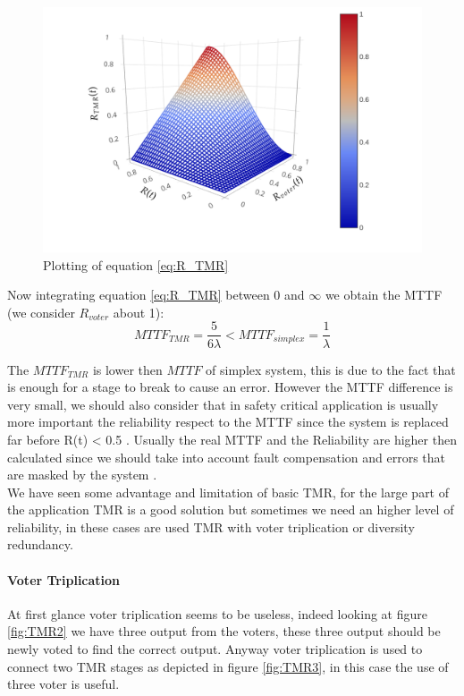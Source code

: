 {{{{    		    \begin{figure}[H]
        			\centering
        			\includegraphics[scale=0.15,center]{./images/TMR_reliability.png}
        			\caption{Plotting of equation \ref{eq:R_TMR}}
        			\label{fig:3Dplot_R_TMR}
        		\end{figure}
        		
        		Now integrating equation \ref{eq:R_TMR} between 0 and $\infty$ we obtain the MTTF  (we consider $R_{voter}$ about 1):
        		\begin{equation}
        		    MTTF_{TMR} = \frac{5}{6 \lambda} < MTTF_{simplex} = \frac{1}{\lambda}
        		\end{equation}
        		
        		The $MTTF_{TMR}$ is lower then $MTTF$ of simplex system, this is due to the fact that is enough for a stage to break to cause an error. However the MTTF difference is very small, we should also consider that in safety critical application is usually more important the reliability respect to the MTTF since the system is replaced far before R(t) < 0.5 .
        		Usually the real MTTF and the Reliability are higher then calculated since we should take into account fault compensation and errors that are masked by the system .\\
        		
        		We have seen some advantage and limitation of basic TMR, for the large part of the application TMR is a good solution but sometimes we need an higher level of reliability, in these cases are used TMR with voter triplication or diversity redundancy.
        		
        		\paragraph{Voter Triplication}{
        		    At first glance voter triplication seems to be useless, indeed looking at figure  \ref{fig:TMR2} we have three output from the voters, these three output should be newly voted to find the correct output. Anyway voter triplication is used to connect two TMR stages as depicted in figure  \ref{fig:TMR3}, in this case the use of three voter is useful. 
        		    
}}}}}
